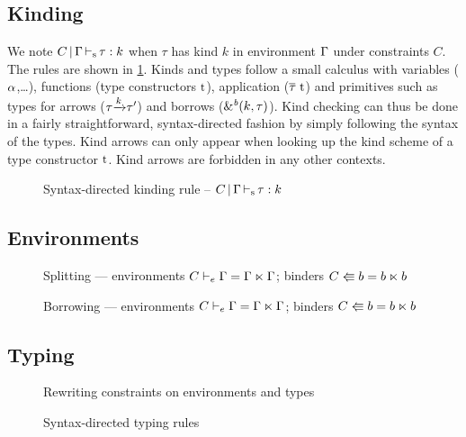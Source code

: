 
\subsection{Kinding}

We note $C \operatorname{|} \Gamma \operatorname{\vdash_s} \tau : k$
when $\tau$ has kind $k$ in environment $\Gamma$ under constraints $C$.
The rules are shown in \cref{rules:sd-kinding}.
Kinds and types follow a small calculus with variables ($\alpha$,\dots),
functions (type constructors $\mathrm{t}$), application ($\overline{\tau_{{}}}\ \mathrm{t}$)
and primitives such as types for arrows ($\tau{\xrightarrow{k}}\tau'$) and
borrows (${\&}^{\textit{b}}(k,\tau)$).
Kind checking can thus be done in a fairly straightforward, syntax-directed
fashion by simply following
the syntax of the types. Kind arrows can only appear when looking
up the kind scheme of a type constructor $\mathrm{t}$. Kind arrows are forbidden
in any other contexts.


\begin{figure}[ht]
  \centering
  
  \caption{Syntax-directed kinding rule --
    $C \operatorname{|} \Gamma \operatorname{\vdash_s} \tau : k$}
  \label{rules:sd-kinding}
\end{figure}

\subsection{Environments}
\label{typ:extra:envs}

\begin{figure}[tp]
  
  \caption{Splitting --- environments $C \vdash_e \Gamma = \Gamma \ltimes \Gamma$; binders $C \Lleftarrow b = b \ltimes b$}
  \label{fig:sd-splitting}
\end{figure}

\begin{figure}[tp]
  
  \caption{Borrowing --- environments $C \vdash_e \Gamma = \Gamma \ltimes \Gamma$; binders $C \Lleftarrow b = b \ltimes b$}
  \label{fig:sd-borrowing}
\end{figure}

\subsection{Typing}

\begin{figure*}[tp]
  
  \caption{Rewriting constraints on environments and types}
  \label{fig:contraints-environments-types}
\end{figure*}
\begin{figure*}[tp]
  
  \caption{Syntax-directed typing rules}
  \label{fig:syntax-directed-typing}
\end{figure*}

